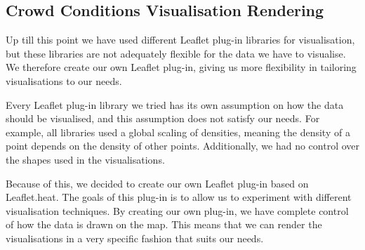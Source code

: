 \subsection{Crowd Conditions Visualisation Rendering}\label{sec:own_leaflet_plugin}

Up till this point we have used different Leaflet plug-in libraries for visualisation, but these libraries are not adequately flexible for the data we have to visualise. We therefore create our own Leaflet plug-in, giving us more flexibility in tailoring visualisations to our needs.

Every Leaflet plug-in library we tried has its own assumption on how the data should be visualised, and this assumption does not satisfy our needs. For example, all libraries used a global scaling of densities, meaning the density of a point depends on the density of other points. Additionally, we had no control over the shapes used in the visualisations.

Because of this, we decided to create our own Leaflet plug-in based on Leaflet.heat. The goals of this plug-in is to allow us to experiment with different visualisation techniques. By creating our own plug-in, we have complete control of how the data is drawn on the map. This means that we can render the visualisations in a very specific fashion that suits our needs.